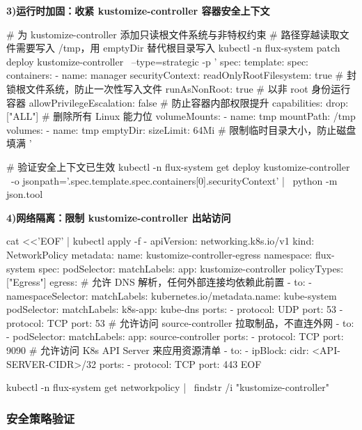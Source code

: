 \textbf{3)运行时加固：收紧 kustomize-controller 容器安全上下文}
\begin{AppendixCode}
# 为 kustomize-controller 添加只读根文件系统与非特权约束
# 路径穿越读取文件需要写入 /tmp，用 emptyDir 替代根目录写入
kubectl -n flux-system patch deploy kustomize-controller \
  --type=strategic -p '
spec:
  template:
    spec:
      containers:
      - name: manager
        securityContext:
          readOnlyRootFilesystem: true       # 封锁根文件系统，防止一次性写入文件
          runAsNonRoot: true                 # 以非 root 身份运行容器
          allowPrivilegeEscalation: false    # 防止容器内部权限提升
          capabilities:
            drop: ["ALL"]                    # 删除所有 Linux 能力位
        volumeMounts:
        - name: tmp
          mountPath: /tmp
      volumes:
      - name: tmp
        emptyDir:
          sizeLimit: 64Mi  # 限制临时目录大小，防止磁盘填满
'

# 验证安全上下文已生效
kubectl -n flux-system get deploy kustomize-controller \
  -o jsonpath='{.spec.template.spec.containers[0].securityContext}' | \
  python -m json.tool
\end{AppendixCode}

\textbf{4)网络隔离：限制 kustomize-controller 出站访问}
\begin{AppendixCode}
cat <<'EOF' | kubectl apply -f -
apiVersion: networking.k8s.io/v1
kind: NetworkPolicy
metadata:
  name: kustomize-controller-egress
  namespace: flux-system
spec:
  podSelector:
    matchLabels:
      app: kustomize-controller
  policyTypes: ["Egress"]
  egress:
  # 允许 DNS 解析，任何外部连接均依赖此前置
  - to:
    - namespaceSelector:
        matchLabels:
          kubernetes.io/metadata.name: kube-system
      podSelector:
        matchLabels:
          k8s-app: kube-dns
    ports:
    - protocol: UDP
      port: 53
    - protocol: TCP
      port: 53
  # 允许访问 source-controller 拉取制品，不直连外网
  - to:
    - podSelector:
        matchLabels:
          app: source-controller
    ports:
    - protocol: TCP
      port: 9090
  # 允许访问 K8s API Server 来应用资源清单
  - to:
    - ipBlock:
        cidr: <API-SERVER-CIDR>/32
    ports:
    - protocol: TCP
      port: 443
EOF

kubectl -n flux-system get networkpolicy | \
  findstr /i "kustomize-controller"
\end{AppendixCode}


\subsubsection{安全策略验证}

